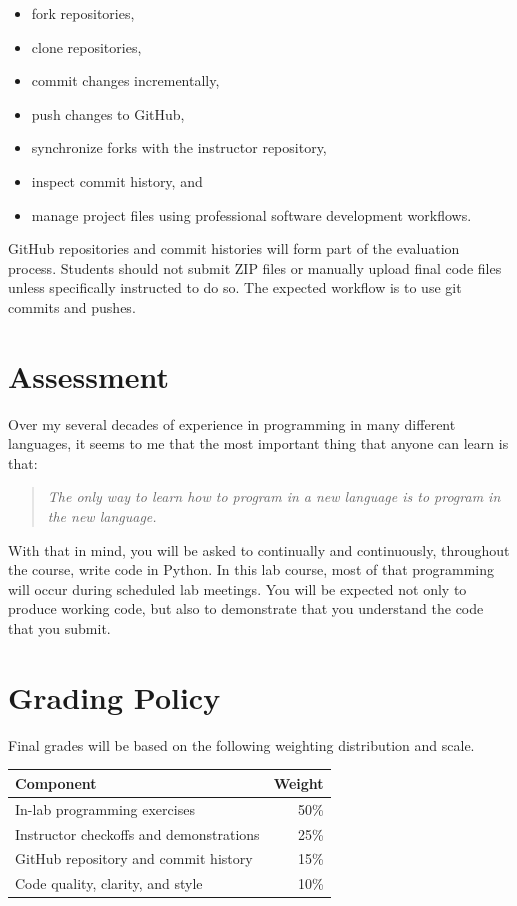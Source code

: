 \documentclass[11pt]{article}
\begin{document}
\begin{itemize}[itemsep=0.2em]
    \item fork repositories,
    \item clone repositories,
    \item commit changes incrementally,
    \item push changes to GitHub,
    \item synchronize forks with the instructor repository,
    \item inspect commit history, and
    \item manage project files using professional software development workflows.
\end{itemize}

GitHub repositories and commit histories will form part of the evaluation process. Students should not submit ZIP files or manually upload final code files unless specifically instructed to do so. The expected workflow is to use git commits and pushes.

\section{Assessment}

Over my several decades of experience in programming in many different languages, it seems to me that the most important thing that anyone can learn is that:

\begin{quote}
\textit{The only way to learn how to program in a new language is to program in the new language.}
\end{quote}

With that in mind, you will be asked to continually and continuously, throughout the course, write code in Python. In this lab course, most of that programming will occur during scheduled lab meetings. You will be expected not only to produce working code, but also to demonstrate that you understand the code that you submit.

\section{Grading Policy}

Final grades will be based on the following weighting distribution and scale.

\begin{center}
\begin{tabular}{@{}lr@{}}
\toprule
\textbf{Component} & \textbf{Weight} \\
\midrule
In-lab programming exercises & 50\% \\
Instructor checkoffs and demonstrations & 25\% \\
GitHub repository and commit history & 15\% \\
Code quality, clarity, and style & 10\% \\
\bottomrule
\end{tabular}
\end{center}
\end{document}
